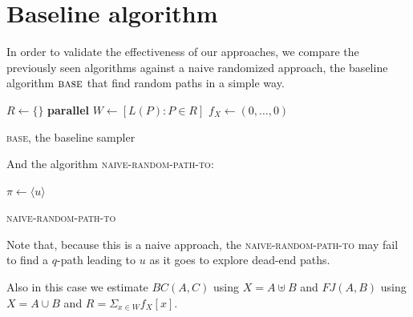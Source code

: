 \clearpage

\section{Baseline algorithm}

In order to validate the effectiveness of our approaches, we compare the previously seen algorithms against a naive randomized approach, the baseline algorithm $\textsc{base}$ that find random paths in a simple way.

\begin{algorithm}[h]
		
	\small
	\DontPrintSemicolon
	\BlankLine
	$R\gets\{\}$\;
	\BlankLine
	\textbf{parallel} 
	\BlankLine
	$W \gets [ L(P) : P \in R ]$\;
	$f_X \gets (0,\ldots,0)$\;
	\BlankLine
	\BlankLine
	\BlankLine
	\caption{\textsc{base}\xspace, the baseline sampler}
	\label{alg:base}
\end{algorithm}
	
And the algorithm \textsc{naive-random-path-to}:
	
\begin{algorithm}[h]
	\small
	\DontPrintSemicolon
	$\pi\gets \langle u \rangle$\;
	\Return{$\pi$}   
		
	\caption{\textsc{naive-random-path-to}}
	\label{alg:naive-random-path-to}
\end{algorithm}

Note that, because this is a naive approach, the \textsc{naive-random-path-to} may fail to find a $q$-path leading to $u$ as it goes to explore dead-end paths.

Also in this case we estimate $BC(A,C)$ using $X = A \uplus B$ and $FJ(A,B)$ using $X = A \cup B$ and $R = \Sigma_{x \in W} f_{X}[x]$.

\clearpage